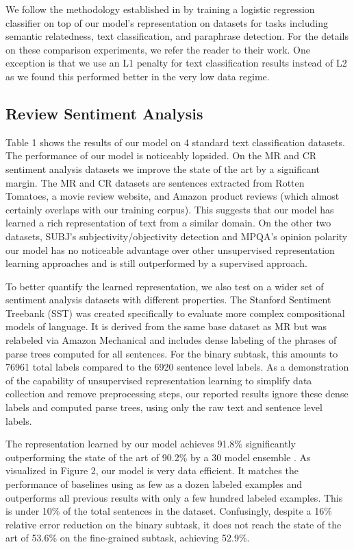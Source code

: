 \documentclass{article}
\begin{document}
We follow the methodology established in \citet{kiros2015skip} by training a logistic regression classifier on top of our model's representation on datasets for tasks including semantic relatedness, text classification, and paraphrase detection. For the details on these comparison experiments, we refer the reader to their work. One exception is that we use an L1 penalty for text classification results instead of L2 as we found this performed better in the very low data regime.

\subsection{Review Sentiment Analysis}

Table 1 shows the results of our model on 4 standard text classification datasets. The performance of our model is noticeably lopsided. On the MR \cite{pang2005seeing} and CR \cite{hu2004mining} sentiment analysis datasets we improve the state of the art by a significant margin. The MR and CR datasets are sentences extracted from Rotten Tomatoes, a movie review website, and Amazon product reviews (which almost certainly overlaps with our training corpus). This suggests that our model has learned a rich representation of text from a similar domain. On the other two datasets, SUBJ's subjectivity/objectivity detection \cite{pang2004sentimental} and MPQA's opinion polarity \cite{wiebe2005annotating} our model has no noticeable advantage over other unsupervised representation learning approaches and is still outperformed by a supervised approach.

To better quantify the learned representation, we also test on a wider set of sentiment analysis datasets with different properties. The Stanford Sentiment Treebank (SST) \cite{socher2013recursive} was created specifically to evaluate more complex compositional models of language. It is derived from the same base dataset as MR but was relabeled via Amazon Mechanical and includes dense labeling of the phrases of parse trees computed for all sentences. For the binary subtask, this amounts to 76961 total labels compared to the 6920 sentence level labels. As a demonstration of the capability of unsupervised representation learning to simplify data collection and remove preprocessing steps, our reported results ignore these dense labels and computed parse trees, using only the raw text and sentence level labels.

The representation learned by our model achieves 91.8\% significantly outperforming the state of the art of 90.2\% by a 30 model ensemble \cite{looks2017deep}. As visualized in Figure 2, our model is very data efficient. It matches the performance of baselines using as few as a dozen labeled examples and outperforms all previous results with only a few hundred labeled examples. This is under 10\% of the total sentences in the dataset. Confusingly, despite a 16\% relative error reduction on the binary subtask, it does not reach the state of the art of 53.6\% on the fine-grained subtask, achieving 52.9\%. 
\end{document}
